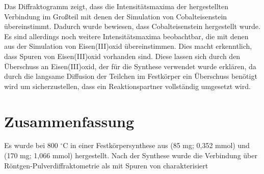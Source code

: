 \documentclass[a4paper,12pt,bibliography=totocnumbered]{scrartcl}
\begin{document}
Das Diffraktogramm zeigt, dass die Intensitätsmaxima der hergestellten Verbindung im Großteil mit denen der Simulation von Cobalteisenstein übereinstimmt.
Dadurch wurde bewiesen, dass Cobalteisenstein hergestellt wurde. Es sind allerdings noch weitere Intensitätsmaxima beobachtbar, die mit denen aus der Simulation von Eisen(III)oxid übereinstimmen.
Dies macht erkenntlich, dass Spuren von Eisen(III)oxid vorhanden sind. Diese lassen sich durch den Überschuss an Eisen(III)oxid, der für die Synthese verwendet wurde erklären, 
da durch die langsame Diffusion der Teilchen im Festkörper ein Überschuss benötigt wird um sicherzustellen, dass ein Reaktionspartner vollständig umgesetzt wird.  



\section{Zusammenfassung}
Es wurde  bei 800 $^\circ$C in einer Festkörpersynthese aus (85 mg; 0,352 mmol) und (170 mg; 1,066 mmol) hergestellt. 
Nach der Synthese wurde die Verbindung über Röntgen-Pulverdiffraktometrie als  mit Spuren von  charakterisiert



\printbibliography[title={Literatur}]
\end{document}
